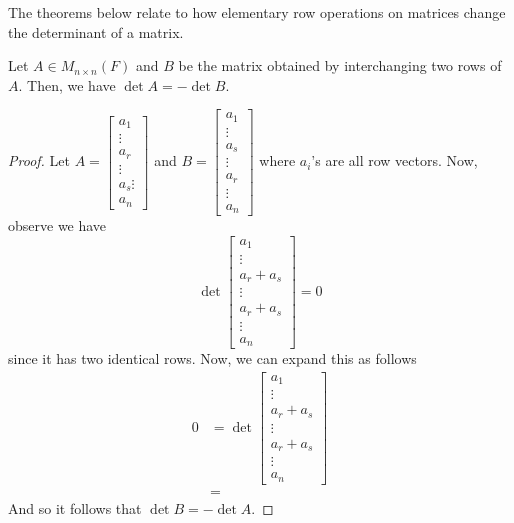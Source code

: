 \documentclass[main.tex]{subfiles}
\begin{document}
    The theorems below relate to how elementary row operations on matrices change the determinant of a matrix. 
    \begin{thrm}{}{}
        Let $A\in M_{n\times n}(F)$ and $B$ be the matrix obtained by interchanging two rows of $A$. Then, we have $\det A = -\det B$. 
    \end{thrm}
    \begin{proof}
        Let $A = \begin{bmatrix}
                a_1 \\ \vdots \\ a_r \\ \vdots \\ a_s \vdots \\ a_n
        \end{bmatrix}$ and $B = \begin{bmatrix}
                a_1 \\ \vdots \\ a_s \\ \vdots \\ a_r \\ \vdots \\ a_n
        \end{bmatrix}$ where $a_i$'s are all row vectors. Now, observe we have 
        \begin{equation*}
                \det \begin{bmatrix}
                        a_1 \\ \vdots \\ a_r + a_s \\ \vdots \\ a_r + a_s \\ \vdots \\ a_n
                \end{bmatrix} = 0
        \end{equation*}
        since it has two identical rows. Now, we can expand this as follows 
        \begin{align*}
            0 &= \det \begin{bmatrix}
                    a_1 \\ \vdots \\ a_r + a_s \\ \vdots \\ a_r + a_s \\ \vdots \\ a_n
            \end{bmatrix} \\ 
              &= 
        \end{align*}
        And so it follows that $\det B = -\det A$. 
    \end{proof}
\end{document}
